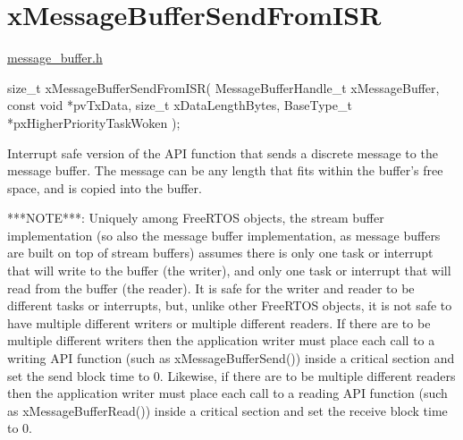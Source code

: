 \hypertarget{group__x_message_buffer_send_from_i_s_r}{}\section{x\+Message\+Buffer\+Send\+From\+I\+SR}
\label{group__x_message_buffer_send_from_i_s_r}
\mbox{\hyperlink{message__buffer_8h_source}{message\+\_\+buffer.\+h}}


\begin{DoxyPre}
size\_t xMessageBufferSendFromISR( MessageBufferHandle\_t xMessageBuffer,
                                  const void *pvTxData,
                                  size\_t xDataLengthBytes,
                                  BaseType\_t *pxHigherPriorityTaskWoken );

\begin{DoxyPre}\end{DoxyPre}
\end{DoxyPre}



\begin{DoxyPre}
\begin{DoxyPre}   Interrupt safe version of the API function that sends a discrete message to
   the message buffer.  The message can be any length that fits within the
   buffer's free space, and is copied into the buffer.\end{DoxyPre}
\end{DoxyPre}



\begin{DoxyPre}
\begin{DoxyPre}   ***NOTE***:  Uniquely among FreeRTOS objects, the stream buffer
   implementation (so also the message buffer implementation, as message buffers
   are built on top of stream buffers) assumes there is only one task or
   interrupt that will write to the buffer (the writer), and only one task or
   interrupt that will read from the buffer (the reader).  It is safe for the
   writer and reader to be different tasks or interrupts, but, unlike other
   FreeRTOS objects, it is not safe to have multiple different writers or
   multiple different readers.  If there are to be multiple different writers
   then the application writer must place each call to a writing API function
   (such as xMessageBufferSend()) inside a critical section and set the send
   block time to 0.  Likewise, if there are to be multiple different readers
   then the application writer must place each call to a reading API function
   (such as xMessageBufferRead()) inside a critical section and set the receive
   block time to 0.\end{DoxyPre}
\end{DoxyPre}



